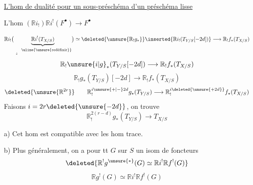 \uline{L'hom de dualité pour un sous-préschéma  d'un préschéma lisse}

L'hom $(\mathbb{R}i_!)\mathbb{R}i^!(F^\bullet)\longrightarrow F^\bullet$


\[
\mathbb{R}i_!\bigl(\underbrace{\mathbb{R}i^!(T_{X/S})}_{\underset{\downarrow}{\phantom{\mathbb{R}i^!}}\ \text{\uline{\unsure{redéfinir}}}}\bigr)
\simeq\deleted{\unsure{\mathbb{R}_!g_*}}
\inserted{\mathbb{R}i_!(T_{Y/S}[-2d])}
\longrightarrow \mathbb{R}_!f_*(T_{X/S})
\]
\[
\mathbb{R}_!\unsure{i|g}_*(T_{Y/S}[-2d])\longrightarrow \mathbb{R}_!f_*(T_{X/S})
\]
\[
\mathbb{R}_!g_*(T_{Y/S})[-2d]\longrightarrow \mathbb{R}_!f_*(T_{X/S})
\]
\[
\deleted{\unsure{\mathbb{R}^{2r}}}\qquad
\mathbb{R}_!^{i\unsure{+|-}2d}g_*(T_{Y/S})\longrightarrow
\mathbb{R}_!^{i\deleted{\unsure{+2d}}}f_*(T_{X/S})
\]
Faisons $i=2r\deleted{\unsure{-2d}}$, on trouve \unsure{)}
\[
\mathbb{R}_!^{2(r-d)}g_*(T_{Y/S})\longrightarrow T_{X/S}
\]

a) Cet hom est compatible avec les hom trace.

b) Plus généralement, on a pour tt $G$ sur $S$ un isom de foncteurs
\[
\deleted{\mathbb{R}^!g^{\unsure{*}}(G)\simeq \mathbb{R}i^!\mathbb{R}f^!(G)}
\]
\[
\mathbb{R}g^!(G)\simeq \mathbb{R}i^!\mathbb{R}f^!(G)
\]

